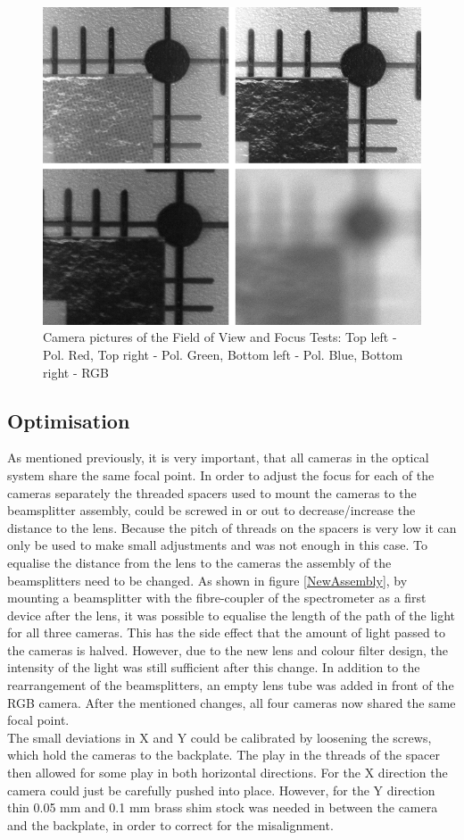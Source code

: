 \begin{figure}
\begin{center}
\includegraphics[width=12cm]{Pictures/FovFoc}
\caption[Camera pictures of the field of view and Focus Tests]{Camera pictures of the Field of View and Focus Tests: Top left - Pol. Red, Top right - Pol. Green, Bottom left - Pol. Blue, Bottom right - RGB}
\label{Fov_Foc}
\end{center}
\end{figure}


\subsection{Optimisation}
As mentioned previously, it is very important, that all cameras in the optical system share the same focal point. In order to adjust the focus for each of the cameras separately the threaded spacers used to mount the cameras to the beamsplitter assembly, could be screwed in or out to decrease/increase the distance to the lens. Because the pitch of threads on the spacers is very low it can only be used to make small adjustments and was not enough in this case. To equalise the distance from the lens to the cameras the assembly of the beamsplitters need to be changed. As shown in figure \ref{NewAssembly}, by mounting a beamsplitter with the fibre-coupler of the spectrometer as a first device after the lens, it was possible to equalise the length of the path of the light for all three cameras. This has the side effect that the amount of light passed to the cameras is halved. However, due to the new lens and colour filter design, the intensity of the light was still sufficient after this change. In addition to the rearrangement of the beamsplitters, an empty lens tube was added in front of the RGB camera. After the mentioned changes, all four cameras now shared the same focal point.\\
The small deviations in X and Y could be calibrated by loosening the screws, which hold the cameras to the backplate. The play in the threads of the spacer then allowed for some play in both horizontal directions. For the X direction the camera could just be carefully pushed into place. However, for the Y direction thin 0.05 mm and 0.1 mm brass shim stock was needed  in between the camera and the backplate, in order to correct for the misalignment. 

